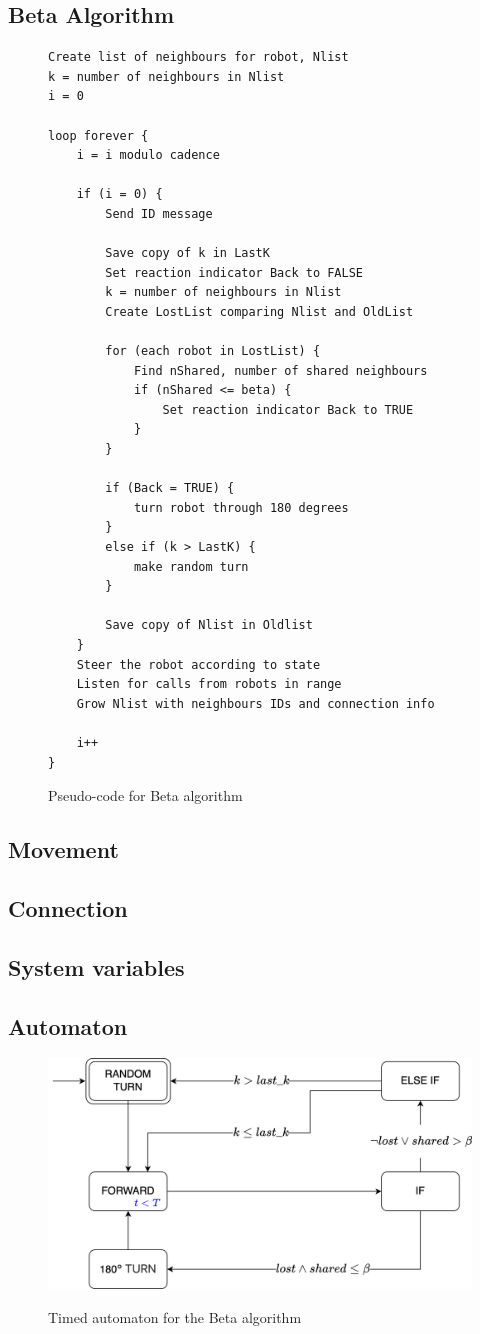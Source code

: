 \subsection{Beta Algorithm}

\begin{figure}[H]
\caption{Pseudo-code for Beta algorithm \cite{Nembrini2002}}
\begin{lstlisting}[style=code]
Create list of neighbours for robot, Nlist
k = number of neighbours in Nlist
i = 0

loop forever {
	i = i modulo cadence

	if (i = 0) {
		Send ID message

		Save copy of k in LastK
		Set reaction indicator Back to FALSE
		k = number of neighbours in Nlist
		Create LostList comparing Nlist and OldList

		for (each robot in LostList) {
			Find nShared, number of shared neighbours
			if (nShared <= beta) {
				Set reaction indicator Back to TRUE
			}
		}

		if (Back = TRUE) {
			turn robot through 180 degrees
		}
		else if (k > LastK) {
			make random turn
		}
		
		Save copy of Nlist in Oldlist
	}
	Steer the robot according to state
	Listen for calls from robots in range
	Grow Nlist with neighbours IDs and connection info

	i++
}
\end{lstlisting}
\label{fig:pseudocode}
\end{figure}


\subsection{Movement}



\subsection{Connection}



\subsection{System variables}



\subsection{Automaton}

\begin{figure}[H]
\caption{Timed automaton for the Beta algorithm}
\includegraphics[width=\textwidth]{images/beta.png}
\label{fig:automaton}
\end{figure}
